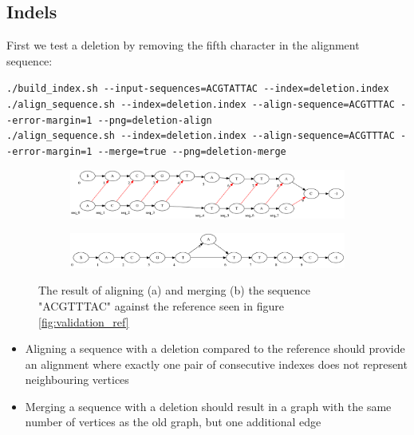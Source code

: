 \documentclass[thesis.tex]{subfiles}
\begin{document}
\subsection*{Indels}
First we test a deletion by removing the fifth character in the alignment sequence:\\
\par\noindent
\texttt{./build\_index.sh -{}-input-sequences=ACGTATTAC -{}-index=deletion.index}\\
\texttt{./align\_sequence.sh -{}-index=deletion.index -{}-align-sequence=ACGTTTAC -{}-error-margin=1 -{}-png=deletion-align}\\
\texttt{./align\_sequence.sh -{}-index=deletion.index -{}-align-sequence=ACGTTTAC -{}-error-margin=1 -{}-merge=true -{}-png=deletion-merge}\\
\begin{figure}[!h]
  \begin{subfigure}[t]{\textwidth}
    \begin{mdframed}
      \includegraphics[width=\textwidth]{output/deletion-align.png}
    \end{mdframed}
    \subcaption{}
  \end{subfigure}
  \begin{subfigure}[t]{\textwidth}
    \begin{mdframed}
      \includegraphics[width=\textwidth]{output/deletion-merge.png}
    \end{mdframed}
    \subcaption{}
  \end{subfigure} 
  \caption{The result of aligning (a) and merging (b) the sequence "ACGTTTAC" against the reference seen in figure \ref{fig:validation_ref}}
  \label{fig:validation_deletion}
\end{figure}
\begin{itemize}
\item Aligning a sequence with a deletion compared to the reference should provide an alignment where exactly one pair of consecutive indexes does not represent neighbouring vertices
\item Merging a sequence with a deletion should result in a graph with the same number of vertices as the old graph, but one additional edge
\end{itemize}
\end{document}
